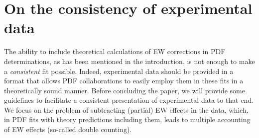 \section{On the consistency of experimental data}
\label{sec:doublecounting}

The ability to include theoretical calculations of EW corrections in
PDF determinations, as has been mentioned in the introduction, is not enough to make a \emph{consistent} fit possible. Indeed, experimental data should
be provided in a format that allows PDF collaborations to easily employ them in these fits in a theoretically sound manner. Before concluding the paper,
we will provide some guidelines to facilitate a consistent presentation of experimental data to that end. We focus on the problem of subtracting (partial) EW effects in the data, which, in PDF fits with theory predictions including them, leads to multiple accounting of EW effects (so-called double counting).

